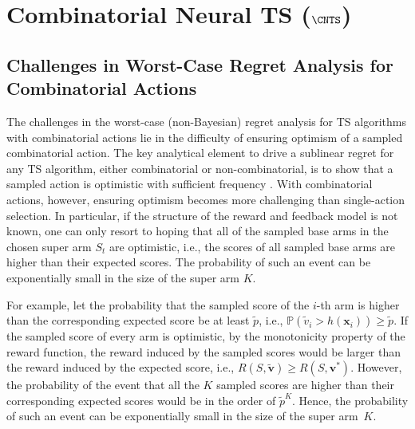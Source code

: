 \documentclass{article}
\theoremstyle{plain}
\begin{document}

\section{Combinatorial Neural TS ($\CNTS$)} \label{sec:CN-TS}

\subsection{Challenges in Worst-Case Regret Analysis for Combinatorial Actions}\label{sec:ts_challenges}

The challenges in the worst-case (non-Bayesian) regret analysis for TS algorithms with combinatorial actions lie in the difficulty of ensuring optimism of a sampled combinatorial action. 
The key analytical element to drive a sublinear regret for any TS algorithm, either combinatorial or non-combinatorial, is to show that a sampled action is optimistic with sufficient frequency \cite{agrawal2013thompson, abeille2017linear}. With combinatorial actions, however, ensuring optimism becomes more challenging than single-action selection. 
In particular, if the structure of the reward and feedback model is not known, one can only resort to hoping that all of the sampled base arms in the chosen super arm $S_t$ are optimistic, i.e., the scores of all sampled base arms are higher than their expected scores. The probability of such an event can be exponentially small in the size of the super arm $K$.

For example, let the probability that the sampled score of the $i$-th arm is higher than the corresponding expected score be at least $\tilde{p}$, i.e., $\mathbb{P}(\tilde{v}_i > h(\mathbf{x}_i)) \ge \tilde{p}$.
If the sampled score of every arm is optimistic, by the monotonicity property of the reward function, the reward induced by the sampled scores would be larger than the reward induced by the expected score, i.e., $R(S, \tilde{\mathbf{v}}) \ge R(S, \mathbf{v}^*)$.
However, the probability of the event that all the $K$ sampled scores are higher than their corresponding expected scores would be in the order of $\tilde{p}^K$.  
Hence, the probability of such an event can be exponentially small in the size of the super arm~$K$.
\end{document}
